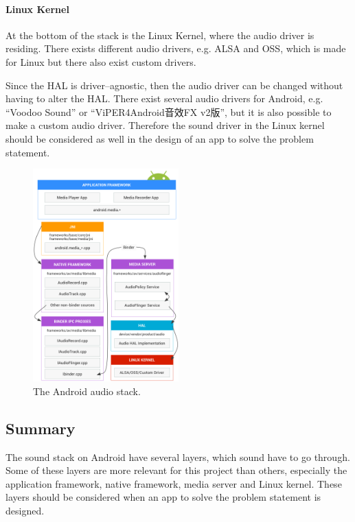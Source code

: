 \paragraph{Linux Kernel}
At the bottom of the stack is the Linux Kernel, where the audio driver is residing.
There exists different audio drivers, e.g. \ac{ALSA} and \ac{OSS}, which is made for Linux but there also exist custom drivers.

Since the \ac{HAL} is driver--agnostic, then the audio driver can be changed without having to alter the \ac{HAL}. 
There exist several audio drivers for Android, e.g. ``Voodoo Sound'' or ``ViPER4Android音效FX v2版'',
but it is also possible to make a custom audio driver\cite{voodoo_sound}\cite{viper4_android}.
Therefore the sound driver in the Linux kernel should be considered as well in the design of an app to solve the problem statement.\cite{sound_stack}%

\begin{figure}[!bht]
    \centering
    \includegraphics[width=0.5\textwidth]{img/sound_stack.png}
    \caption{The Android audio stack\cite{sound_stack}.}
    \label{fig:sound_stack}
\end{figure}

\subsection{Summary}
The sound stack on Android have several layers, which sound have to go through.
Some of these layers are more relevant for this project than others,
especially the application framework, native framework, media server and Linux kernel.
These layers should be considered when an app to solve the problem statement is designed.


